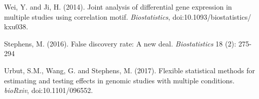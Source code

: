 \documentclass[11pt]{article}
\begin{document}
\begin{thebibliography}{99}

Wei, Y. and Ji, H. (2014). Joint analysis of differential gene expression in multiple studies using correlation motif. {\it Biostatistics}, doi:10.1093/biostatistics/
kxu038.

Stephens, M. (2016). False discovery rate: A new deal. {\it Biostatistics} 18 (2): 275-294

Urbut, S.M., Wang, G. and Stephens, M. (2017). Flexible statistical methods for estimating and testing effects in genomic studies with multiple conditions. {\it bioRxiv}, doi:10.1101/096552.

\end{thebibliography}
\end{document}
